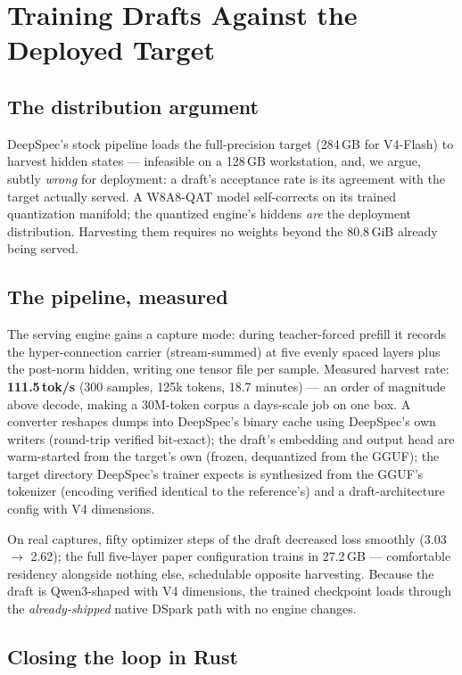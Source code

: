\documentclass[11pt]{article}
\begin{document}
\section{Training Drafts Against the Deployed Target}

\subsection{The distribution argument}

DeepSpec's stock pipeline loads the full-precision target (284\,GB for
V4-Flash) to harvest hidden states --- infeasible on a 128\,GB
workstation, and, we argue, subtly \emph{wrong} for deployment: a draft's
acceptance rate is its agreement with the target actually served. A
W8A8-QAT model self-corrects on its trained quantization manifold; the
quantized engine's hiddens \emph{are} the deployment distribution.
Harvesting them requires no weights beyond the 80.8\,GiB already being
served.

\subsection{The pipeline, measured}

The serving engine gains a capture mode: during teacher-forced prefill it
records the hyper-connection carrier (stream-summed) at five evenly
spaced layers plus the post-norm hidden, writing one tensor file per
sample. Measured harvest rate: \textbf{111.5\,tok/s} (300 samples,
125k tokens, 18.7 minutes) --- an order of magnitude above decode, making
a 30M-token corpus a days-scale job on one box. A converter reshapes
dumps into DeepSpec's binary cache using DeepSpec's own writers
(round-trip verified bit-exact); the draft's embedding and output head
are warm-started from the target's own (frozen, dequantized from the
GGUF); the target directory DeepSpec's trainer expects is synthesized
from the GGUF's tokenizer (encoding verified identical to the
reference's) and a draft-architecture config with V4 dimensions.

On real captures, fifty optimizer steps of the draft decreased loss
smoothly (3.03 $\rightarrow$ 2.62); the full five-layer paper
configuration trains in 27.2\,GB --- comfortable residency alongside
nothing else, schedulable opposite harvesting. Because the draft is
Qwen3-shaped with V4 dimensions, the trained checkpoint loads through the
\emph{already-shipped} native DSpark path with no engine changes.

\subsection{Closing the loop in Rust}
\end{document}
